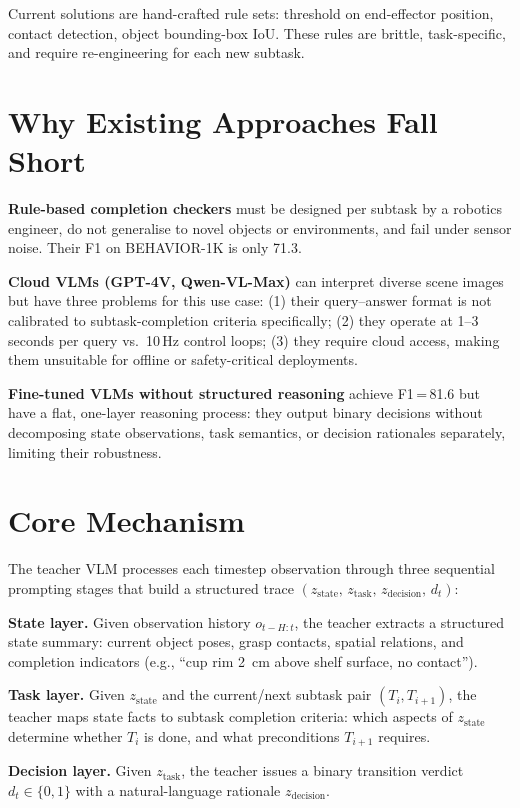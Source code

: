 \documentclass[10pt,twocolumn]{article}
\begin{document}
Current solutions are hand-crafted rule sets: threshold on end-effector
position, contact detection, object bounding-box IoU. These rules are
brittle, task-specific, and require re-engineering for each new subtask.

\section{Why Existing Approaches Fall Short}

\textbf{Rule-based completion checkers} must be designed per subtask by
a robotics engineer, do not generalise to novel objects or environments,
and fail under sensor noise. Their F1 on BEHAVIOR-1K is only 71.3.

\textbf{Cloud VLMs (GPT-4V, Qwen-VL-Max)} can interpret diverse scene
images but have three problems for this use case: (1) their query--answer
format is not calibrated to subtask-completion criteria specifically;
(2) they operate at 1--3 seconds per query vs.\ 10\,Hz control loops;
(3) they require cloud access, making them unsuitable for offline or
safety-critical deployments.

\textbf{Fine-tuned VLMs without structured reasoning} achieve F1\,=\,81.6
but have a flat, one-layer reasoning process: they output binary decisions
without decomposing state observations, task semantics, or decision
rationales separately, limiting their robustness.

\section{Core Mechanism}

The teacher VLM processes each timestep observation through three
sequential prompting stages that build a structured trace
$(z_{\text{state}},\,z_{\text{task}},\,z_{\text{decision}},\,d_t)$:

\textbf{State layer.} Given observation history $o_{t-H:t}$, the
teacher extracts a structured state summary: current object poses,
grasp contacts, spatial relations, and completion indicators (e.g.,
``cup rim 2~cm above shelf surface, no contact'').

\textbf{Task layer.} Given $z_{\text{state}}$ and the current/next
subtask pair $(T_i, T_{i+1})$, the teacher maps state facts to subtask
completion criteria: which aspects of $z_{\text{state}}$ determine
whether $T_i$ is done, and what preconditions $T_{i+1}$ requires.

\textbf{Decision layer.} Given $z_{\text{task}}$, the teacher issues
a binary transition verdict $d_t \in \{0,1\}$ with a natural-language
rationale $z_{\text{decision}}$.
\end{document}
